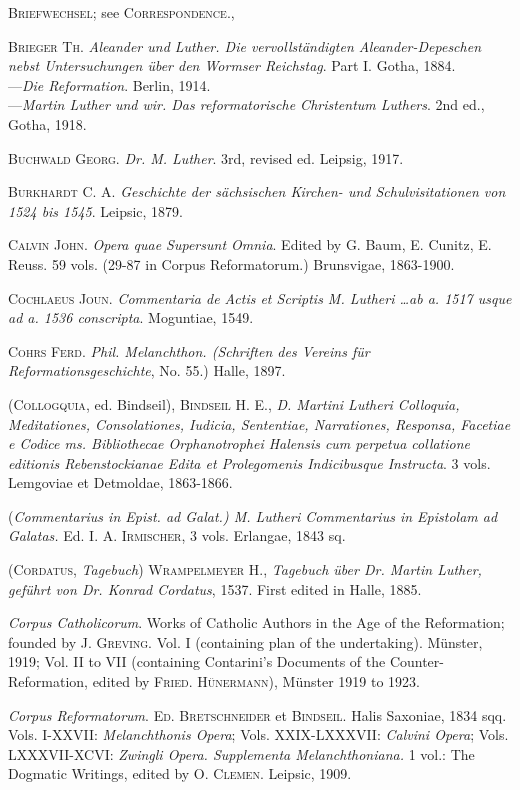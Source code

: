 \textsc{Briefwechsel}; see \textsc{Correspondence.},

\textsc{Brieger Th.} \textit{Aleander und Luther. Die vervollständigten Aleander-Depeschen
nebst Untersuchungen über den Wormser Reichstag}. Part I. Gotha, 1884. \\
---\textit{Die Reformation}. Berlin, 1914. \\
---\textit{Martin Luther und wir. Das reformatorische Christentum Luthers}. 2nd
ed., Gotha, 1918.

\textsc{Buchwald Georg.} \textit{Dr. M. Luther}. 3rd, revised ed. Leipsig, 1917.

\textsc{Burkhardt C. A.} \textit{Geschichte der sächsischen Kirchen- und Schulvisitationen
von 1524 bis 1545}. Leipsic, 1879.

\textsc{Calvin John.} \textit{Opera quae Supersunt Omnia}. Edited by G. Baum, E. Cunitz,
	E. Reuss. 59 vols. (29-87 in Corpus Reformatorum.) Brunsvigae, 1863-1900.

\textsc{Cochlaeus Joun.} \textit{Commentaria de Actis et Scriptis M. Lutheri \dots ab a.
1517 usque ad a. 1536 conscripta}. Moguntiae, 1549.

\textsc{Cohrs Ferd.} \textit{Phil. Melanchthon. (Schriften des Vereins für Reformationsgeschichte},
No. 55.) Halle, 1897.

(\textsc{Collogquia}, ed. Bindseil), \textsc{Bindseil H. E.}, \textit{D. Martini Lutheri Colloquia,
Meditationes, Consolationes, Iudicia, Sententiae, Narrationes, Responsa,
Facetiae e Codice ms. Bibliothecae Orphanotrophei Halensis cum perpetua
collatione editionis Rebenstockianae Edita et Prolegomenis Indicibusque
Instructa}. 3 vols. Lemgoviae et Detmoldae, 1863-1866.

(\textit{Commentarius in Epist. ad Galat.) M. Lutheri Commentarius in Epistolam
ad Galatas.} Ed. \textsc{I. A. Irmischer}, 3 vols. Erlangae, 1843 sq.

(\textsc{Cordatus}, \textit{Tagebuch}) \textsc{Wrampelmeyer H.}, \textit{Tagebuch über Dr. Martin
Luther, geführt von Dr. Konrad Cordatus}, 1537. First edited in Halle, 1885.

\textit{Corpus Catholicorum}. Works of Catholic Authors in the Age of the Reformation;
founded by \textsc{J. Greving.} Vol. I (containing plan of the undertaking).
Münster, 1919; Vol. II to VII (containing Contarini’s Documents
of the Counter-Reformation, edited by \textsc{Fried. Hünermann}), Münster
1919 to 1923.

\textit{Corpus Reformatorum}. \textsc{Ed. Bretschneider} et \textsc{Bindseil}. Halis Saxoniae, 1834
sqq. Vols. I-XXVII: \textit{Melanchthonis Opera}; Vols. XXIX-LXXXVII: \textit{Calvini
Opera}; Vols. LXXXVII-XCVI: \textit{Zwingli Opera. Supplementa Melanchthoniana.}
1 vol.: The Dogmatic Writings, edited by \textsc{O. Clemen.}
Leipsic, 1909.

